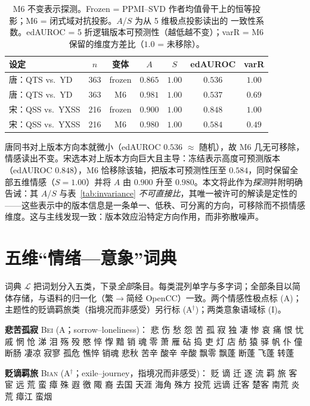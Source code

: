 \documentclass[11pt]{article}
\begin{document}
\begin{table}[H]
\centering\small
\caption{M6 不变表示探测。Frozen = PPMI–SVD 作者均值骨干上的恒等投影；M6 = 闭式域对抗投影。$A$/$S$ 为从 5 维极点投影读出的 一致性系数。edAUROC = 5 折逻辑版本可预测性（越低越不变）；varR = M6 保留的维度方差比（$1.0$ = 未移除）。}
\label{tab:m6}
\setlength{\tabcolsep}{3.2pt}
\begin{tabular}{lcccccc}
\toprule
设定 & $n$ & 变体 & $A$ & $S$ & edAUROC & varR\\
\midrule
唐：QTS vs.\ YD & 363 & frozen & $0.865$ & $1.00$ & $0.536$ & $1.00$\\
唐：QTS vs.\ YD & 363 & M6 & $0.981$ & $1.00$ & $0.537$ & $0.69$\\
\midrule
宋：QSS vs.\ YXSS & 216 & frozen & $0.900$ & $1.00$ & $0.848$ & $1.00$\\
宋：QSS vs.\ YXSS & 216 & M6 & $0.980$ & $1.00$ & $0.584$ & $0.49$\\
\bottomrule
\end{tabular}
\end{table}

唐同书对上版本方向本就微小（edAUROC $0.536$ $\approx$ 随机），故 M6 几无可移除，情感读出不变。宋选本对上版本方向巨大且主导：冻结表示高度可预测版本（edAUROC $0.848$），M6 恰移除该轴，把版本可预测性压至 $0.584$，同时保留全部五维情感（$S{=}1.00$）并将 $A$ 由 $0.900$ 升至 $0.980$。本文将此作为\emph{探测}并附明确告诫：其 $A$/$S$ 与表~\ref{tab:invariance} \emph{不可直接比}，其唯一被许可的解读是定性的——这些表示中的版本信息是一条单一、低秩、可分离的方向，可移除而不损情感维度。这与主线发现一致：版本效应沿特定方向作用，而非弥散噪声。

\section{五维“情绪—意象”词典}
\label{app:lexicon}
词典 $\mathcal{L}$ 把词划分入五类，下录\emph{全部}条目。每类混列单字与多字词；全部条目以简体存储，与语料的归一化（繁$\to$简经 OpenCC）一致。两个情感性极点标 (A)；主题性的贬谪羁旅类（指境况而非感受）另行标 (A$^\dagger$)；两类意象语域标 (I)。

\smallskip
\noindent\textbf{悲苦孤寂} \textsc{Bei} (A；sorrow–loneliness)：
悲 伤 愁 怨 苦 孤 寂 独 凄 惨 哀 痛 恨 忧 戚 惘 怆 涕 泪 殇 殁 愍 悴 惸 黯 销 魂 零 萧 雁 砧 捣 吏 灯 店 舫 猿 驿 帆 仆 僮
断肠 凄凉 寂寥 孤危 憔悴 销魂 悲秋 苦辛 酸辛 辛酸 飘零 飘蓬 断蓬 飞蓬 转蓬

\smallskip
\noindent\textbf{贬谪羁旅} \textsc{Bian} (A$^\dagger$；exile–journey，指境况而非感受)：
贬 谪 迁 逐 流 羁 旅 客 宦 远 荒 蛮 瘴 殊 遐 徼 陬 裔
去国 天涯 海角 殊方 投荒 远谪 迁客 楚客 南荒 炎荒 瘴江 蛮烟
\end{document}
